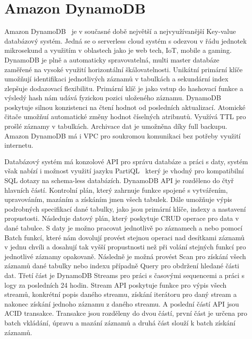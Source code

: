 \documentclass[czech,bachelor,dept460,male,csharp,cpdeclaration]{diploma}
\begin{document}
	\section{Amazon DynamoDB}
	
	Amazon DynamoDB~\cite{dynamodb} je v současné době největší a nejvyužívanější Key-value databázový systém. Jedná se o serverless cloud systém s odezvou v řádu jednotek mikrosekund a využitím v oblastech jako je web tech, IoT, mobile a gaming. DynamoDB je plně a automaticky spravovatelná, multi master databáze zaměřené na vysoké využití horizontální škálovatelnosti. Unikátní primární klíče umožňují identifikaci jednotlivých záznamů v tabulkách a sekundární index zlepšuje dodazovací flexibilitu. Primární klíč je jako vstup do hashovací funkce a výsledý hash nám udává fyzickou pozici uloženého záznamu. DynamoDB poskytuje silnou konzistenci na čtení hodnot od posledních aktualizací. Atomické čitače umožňuí automatické změny hodnot číselných atribnutů. Využívá TTL pro prošlé záznamy v tabulkách. Archivace dat je umožněna díky full backupu. Amazon DynamoDB má i VPC pro soukromou komunikaci bez potřeby využití internetu.
	
	Databázový systém má konzolové API pro správu databáze a práci s daty, systém však nabízí i možnost využití jazyku PartiQL~\cite{partiql} který je vhodný pro kompatibilní SQL dotazy na schema-less databázích. DynamoDB API je rozděleno do čtyř hlavních částí. Kontrolní plán, který zahrnuje funkce spojené s vytvářením, upravováním, mazáním a získáním jmen všech tabulek. Dále umožňuje výpis podrobných specifikací dané tabulky, jako jsou primární klíče, indexy a nastavení propustosti. Následuje datový plán, který poskytuje CRUD operace pro data v dané tabulce. S daty je možno pracovat jednotlivě po záznamech a nebo pomocí Batch funkcí, které nám dovolují provést stejnou operaci nad desítkami záznamů v jednu chvíli a dosahují tak vyšší propustnosti než při volání stejných funkcí pro jednotlivé záznamy opakovaně. Následně je možná provést Scan pro získání všech záznamů dané tabulky nebo indexu případně Query pro obdržení hledané části dat. Třetí část je DynamoDB Streams pro práci s časovými sequencemi a práci s logy za posledních 24 hodin. Stream API poskytuje funkce pro výpis všech streamů, konkrétní popis daného streamu, získání iterátoru pro daný stream a nakonec získání jednoho záznamu z daného streamu. A poslední částí API jsou ACID transakce. Transakce jsou rozděleny do dvou částí, první část je určena pro batch vkládání, úpravu a mazání záznamů a druhá část slouží k batch získání záznamů.
		
\end{document}
